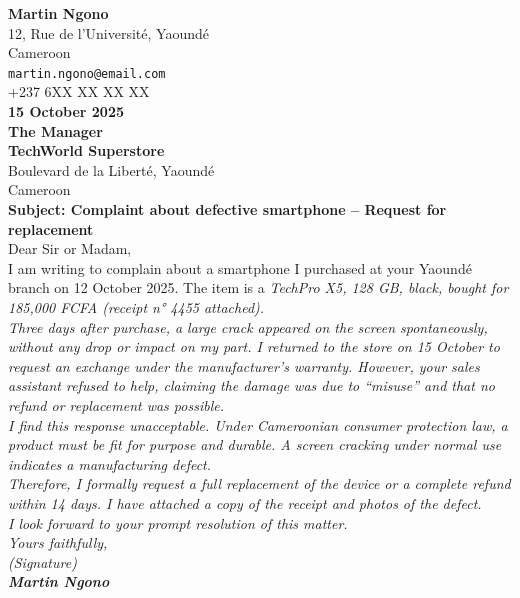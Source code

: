 \documentclass[11pt]{article}
\newcommand{\eng}[1]{\ifmmode\text{\textit{#1}}\else\begingroup\selectlanguage{english}\itshape #1\endgroup\fi}
\begin{document}
\begin{corrige}
\begin{textebox}
\textbf{Martin Ngono} \\
12, Rue de l'Université, Yaoundé \\
Cameroon \\
\texttt{martin.ngono@email.com} \\
+237 6XX XX XX XX \\

\textbf{15 October 2025} \\

\textbf{The Manager} \\
\textbf{TechWorld Superstore} \\
Boulevard de la Liberté, Yaoundé \\
Cameroon \\

\textbf{Subject: Complaint about defective smartphone -- Request for replacement} \\

Dear Sir or Madam, \\

I am writing to complain about a smartphone I purchased at your Yaoundé branch on 12 October 2025. The item is a \eng{TechPro X5}, 128 GB, black, bought for 185,000 FCFA (receipt n° 4455 attached). \\

Three days after purchase, a large crack appeared on the screen spontaneously, without any drop or impact on my part. I returned to the store on 15 October to request an exchange under the manufacturer's warranty. However, your sales assistant refused to help, claiming the damage was due to ``misuse'' and that no refund or replacement was possible. \\

I find this response unacceptable. Under Cameroonian consumer protection law, a product must be fit for purpose and durable. A screen cracking under normal use indicates a manufacturing defect. \\

Therefore, I formally request a full replacement of the device or a complete refund within 14 days. I have attached a copy of the receipt and photos of the defect. \\

I look forward to your prompt resolution of this matter. \\

Yours faithfully, \\

\textit{(Signature)} \\

\textbf{Martin Ngono}
\end{textebox}
\end{corrige}
\end{document}
